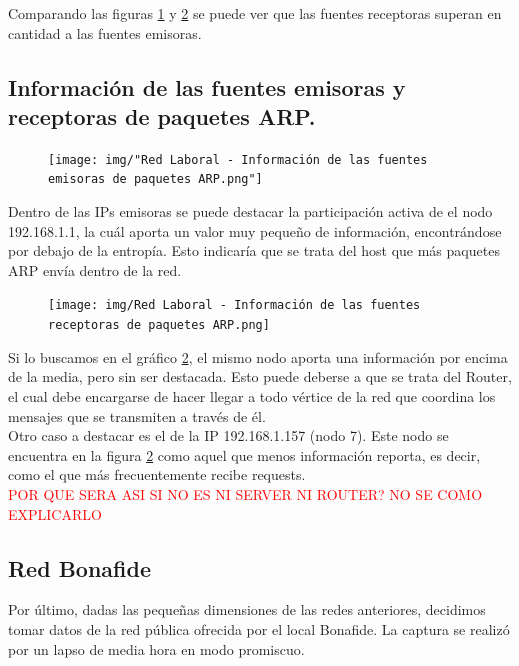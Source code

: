 Comparando las figuras \ref{laboral:emisoras} y \ref{laboral:receptoras} se puede ver que las fuentes receptoras superan en cantidad a las fuentes emisoras.\\

\subsection{Información de las fuentes emisoras y receptoras de paquetes ARP.}

\begin{figure}[h!]
    \centering                                                       
    \texttt{[image: img/"Red Laboral - Información de las fuentes emisoras de paquetes ARP.png"]}
    \caption{}
    \label{laboral:emisoras}
\end{figure}

Dentro de las IPs emisoras se puede destacar la participación activa de el nodo 192.168.1.1, la cuál aporta un valor muy pequeño de información, encontrándose por debajo de la entropía. Esto indicaría que se trata del host que más paquetes ARP envía dentro de la red. \\

\begin{figure}[h!]
    \centering                                                       
    \texttt{[image: img/Red Laboral - Información de las fuentes receptoras de paquetes ARP.png]}
    \caption{}
    \label{laboral:receptoras}
\end{figure}

Si lo buscamos en el gráfico \ref{laboral:receptoras}, el mismo nodo aporta una información por encima de la media, pero sin ser destacada. Esto puede deberse a que se trata del Router, el cual debe encargarse de hacer llegar a todo vértice de la red que coordina los mensajes que se transmiten a través de él.\\
Otro caso a destacar es el de la IP 192.168.1.157 (nodo 7). Este nodo se encuentra en la figura \ref{laboral:receptoras} como aquel que menos información reporta, es decir, como el que más frecuentemente recibe requests. \\ \textcolor{red}{POR QUE SERA ASI SI NO ES NI SERVER NI ROUTER? NO SE COMO EXPLICARLO}


\newpage
\subsection{Red Bonafide}
 Por último, dadas las peque\~nas dimensiones de las redes anteriores, decidimos tomar datos de la red pública ofrecida por el local Bonafide. La captura se realizó por un lapso de media hora en modo promiscuo.

